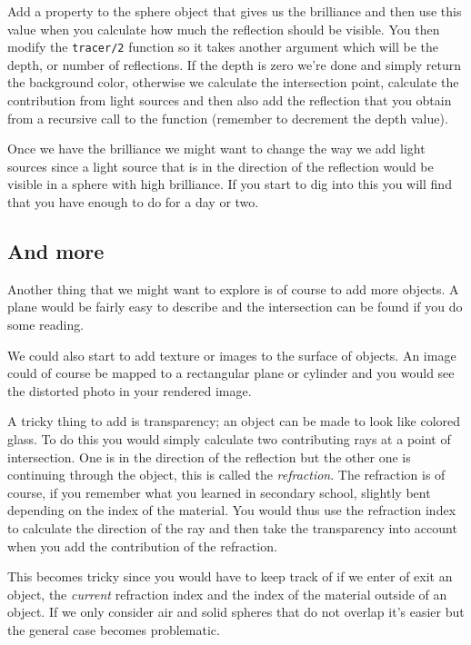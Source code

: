 \documentclass[a4paper,11pt]{article}
\begin{document}
Add a property to the sphere object that gives us the brilliance and
then use this value when you calculate how much the reflection should
be visible. You then modify the {\tt tracer/2} function so it takes
another argument which will be the depth, or number of reflections. If
the depth is zero we're done and simply return the background color,
otherwise we calculate the intersection point, calculate the
contribution from light sources and then also add the reflection that
you obtain from a recursive call to the function (remember to
decrement the depth value).

Once we have the brilliance we might want to change the way we add
light sources since a light source that is in the direction of the
reflection would be visible in a sphere with high brilliance. If you
start to dig into this you will find that you have enough to do for a
day or two.

\subsection*{And more}

Another thing that we might want to explore is of course to add more
objects. A plane would be fairly easy to describe and the intersection
can be found if you do some reading.

We could also start to add texture or images to the surface of
objects. An image could of course be mapped to a rectangular plane or
cylinder and you would see the distorted photo in your rendered image.

A tricky thing to add is transparency; an object can be made to
look like colored glass. To do this you would simply calculate two
contributing rays at a point of intersection. One is in the direction
of the reflection but the other one is continuing through the object,
this is called the {\em refraction}. The refraction is of course, if
you remember what you learned in secondary school, slightly bent
depending on the index of the material. You would thus use the
refraction index to calculate the direction of the ray and then take
the transparency into account when you add the contribution of the
refraction.

This becomes tricky since you would have to keep track of if we enter
of exit an object, the {\em current} refraction index and the index of
the material outside of an object. If we only consider air and solid
spheres that do not overlap it's easier but the general case becomes
problematic.
\end{document}
